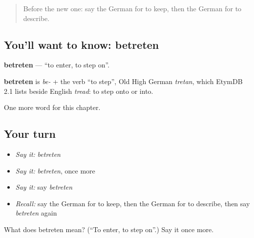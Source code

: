\label{lesson:GE-C176-betreten}



\begin{quote}
Before the new one: say the German for to keep, then the German for to describe.
\end{quote}

\subsection*{You'll want to know: betreten}
\textbf{betreten} — \textquotedblleft{}to enter, to step on\textquotedblright{}.

\begin{cousinweb}
\textbf{betreten} is \emph{be-} + the verb \textquotedblleft{}to step\textquotedblright{}, Old High German \emph{tretan}, which EtymDB 2.1 lists beside English \emph{tread}: to step onto or into.
\end{cousinweb}

\begin{grammarlens}[title={What you've built}]
One more word for this chapter.
\end{grammarlens}

\subsection*{Your turn}
\begin{itemize}
\raggedright
  \item \emph{Say it:} \emph{betreten}
  \item \emph{Say it:} \emph{betreten}, once more
  \item \emph{Say it:} say \emph{betreten}
  \item \emph{Recall:} say the German for to keep, then the German for to describe, then say \emph{betreten} again
\end{itemize}

\begin{tcolorbox}[breakable,colback=teal!4,colframe=teal!35!black,title={Before you move on}]
What does betreten mean? (\textquotedblleft{}To enter, to step on\textquotedblright{}.) Say it once more.
\end{tcolorbox}
